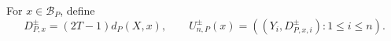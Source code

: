 For \(x\in\mathcal B_P\), define
\[
 D^{\pm}_{P,x}=(2T-1)d_P(X,x),\qquad
 U^{\pm}_{n,P}(x)=((Y_i,D^{\pm}_{P,x,i}):1\leq i\leq n).
\]